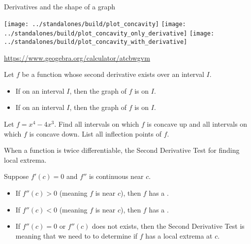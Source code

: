 \documentclass[../main.tex]{subfiles}
\begin{document}
\begin{lesson}{Derivatives and the shape of a graph}
  \begin{center}
    \texttt{[image: ../standalones/build/plot\_concavity]}
    \hfill
    \texttt{[image: ../standalones/build/plot\_concavity\_only\_derivative]}
    \hfill
    \texttt{[image: ../standalones/build/plot\_concavity\_with\_derivative]}

    \url{https://www.geogebra.org/calculator/atcbwgvm}
  \end{center}

  \begin{mdframed}[style=withref-compact]
    Let \(f\) be a function whose second derivative exists over an interval \(I\).
    \begin{itemize}
      \item If \underline{\hspace{1in}} on an interval \(I\), then the graph of \(f\) is  on \(I\).
      \item If \underline{\hspace{1in}} on an interval \(I\), then the graph of \(f\) is  on \(I\).
    \end{itemize}

  \end{mdframed}

  \begin{example} \label{ex:concavity}
    Let \(f = x^{4} - 4x^{3}\). Find all intervals on which \(f\) is concave up and all intervals on which \(f\) is concave down. List all inflection points of \(f\).

  \end{example}

  \clearpage

  When a function is twice differentiable, the Second Derivative Test  for finding local extrema.

  \begin{mdframed}[style=withref-compact]
    Suppose \(f'(c) = 0\) and \(f''\) is continuous near \(c\).
    \begin{itemize}
      \item If \(f''(c) > 0\) (meaning \(f\) is \underline{\phantom{concave down}} near \(c\)), then \(f\) has a \underline{\hspace{1in}}.
      \item If \(f''(c) < 0\) (meaning \(f\) is \underline{\phantom{concave down}} near \(c\)), then \(f\) has a \underline{\hspace{1in}}.
      \item[\faExclamationTriangle{}] If \(f''(c) = 0\) or \(f''(c)\) does not exists, then the Second Derivative Test is  meaning that we need to  to determine if \(f\) has a local extrema at \(c\).
    \end{itemize}


\end{mdframed}
\end{lesson}
\end{document}
